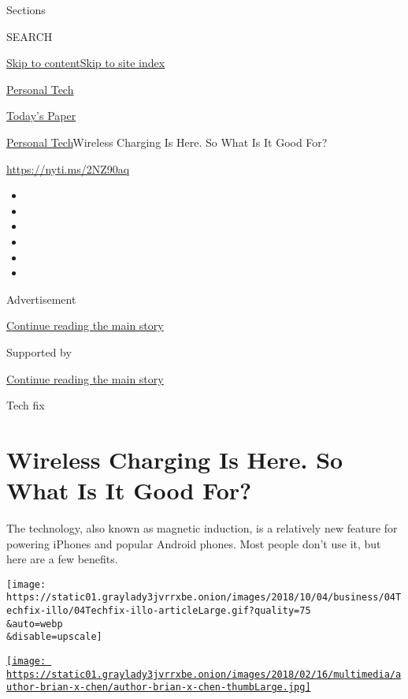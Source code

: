 Sections

SEARCH

\protect\hyperlink{site-content}{Skip to
content}\protect\hyperlink{site-index}{Skip to site index}

\href{https://www.nytimes3xbfgragh.onion/section/technology/personaltech}{Personal
Tech}

\href{https://myaccount.nytimes3xbfgragh.onion/auth/login?response_type=cookie\&client_id=vi}{}

\href{https://www.nytimes3xbfgragh.onion/section/todayspaper}{Today's
Paper}

\href{/section/technology/personaltech}{Personal Tech}\textbar{}Wireless
Charging Is Here. So What Is It Good For?

\url{https://nyti.ms/2NZ90aq}

\begin{itemize}
\item
\item
\item
\item
\item
\item
\end{itemize}

Advertisement

\protect\hyperlink{after-top}{Continue reading the main story}

Supported by

\protect\hyperlink{after-sponsor}{Continue reading the main story}

Tech fix

\hypertarget{wireless-charging-is-here-so-what-is-it-good-for}{%
\section{Wireless Charging Is Here. So What Is It Good
For?}\label{wireless-charging-is-here-so-what-is-it-good-for}}

The technology, also known as magnetic induction, is a relatively new
feature for powering iPhones and popular Android phones. Most people
don't use it, but here are a few benefits.

\texttt{[image: https://static01.graylady3jvrrxbe.onion/images/2018/10/04/business/04Techfix-illo/04Techfix-illo-articleLarge.gif?quality=75\\\&auto=webp\\\&disable=upscale]}

\href{https://www.nytimes3xbfgragh.onion/by/brian-x-chen}{\texttt{[image: https://static01.graylady3jvrrxbe.onion/images/2018/02/16/multimedia/author-brian-x-chen/author-brian-x-chen-thumbLarge.jpg]}}

